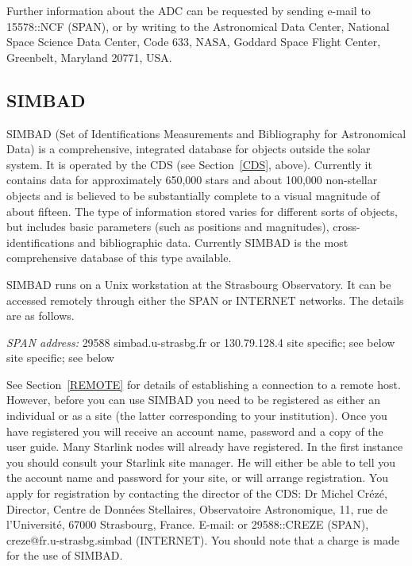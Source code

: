 \documentclass[twoside,11pt]{article}
\newcommand{\xlabel}[1]{}
\begin{document}
Further information about the ADC can be requested by sending e-mail
to 15578::NCF (SPAN), or by writing to the Astronomical Data Center, 
National Space Science Data Center, Code 633, NASA, Goddard Space Flight
Center, Greenbelt, Maryland 20771, USA.

\subsection{SIMBAD\xlabel{simbad}}

SIMBAD (Set of Identifications Measurements and Bibliography for 
Astronomical Data) is a comprehensive, integrated database for objects
outside the solar system. It is operated by the CDS (see 
Section~\ref{CDS}, above). Currently it contains data for 
approximately 650,000 stars and about 100,000 non-stellar objects and
is believed to be substantially complete to a visual magnitude of about 
fifteen. The type of information stored varies for different sorts of 
objects, but includes basic parameters (such as positions and 
magnitudes), cross-identifications and bibliographic data. Currently
SIMBAD is the most comprehensive database of this type available.

SIMBAD runs on a Unix workstation at the Strasbourg Observatory. It
can be accessed remotely through either the SPAN or INTERNET networks.
The details are as follows.

{\it SPAN address: } 29588
 simbad.u-strasbg.fr or 130.79.128.4
 site specific; see below
 site specific; see below

See Section~\ref{REMOTE} for details of establishing a connection to
a remote host. However, before you can use SIMBAD you need to be 
registered as either an individual or as a site (the latter 
corresponding to your institution). Once you have registered you will 
receive an account name, password and a copy of the user guide. Many 
Starlink nodes will already have registered. In the first instance you 
should consult your Starlink site manager. He will either be able to 
tell you the account name and password for your site, or will arrange 
registration. You apply for registration by contacting the director of 
the CDS: Dr Michel Cr\'{e}z\'{e}, Director, Centre de Donn\'{e}es 
Stellaires, Observatoire Astronomique, 11, rue de l'Universit\'{e}, 
67000 Strasbourg, France. E-mail: or 29588::CREZE (SPAN), 
creze@fr.u-strasbg.simbad (INTERNET). You should note that a charge is
made for the use of SIMBAD.
\end{document}
